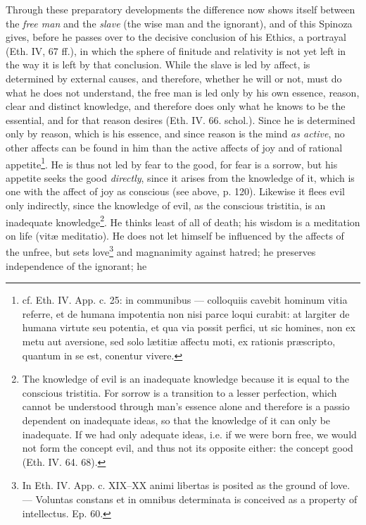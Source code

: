 \documentclass[12pt,a4paper,openany]{book}
\newcommand{\opage}[1]{\marginnote{\footnotesize\textit{[#1]}}}
\begin{document}
\opage{130}\setcounter{footnote}{0}Through these preparatory developments the difference
now shows itself between the \emph{free man} and the \emph{slave} (the wise man and
the ignorant), and of this Spinoza gives, before he passes
over to the decisive conclusion of his Ethics, a portrayal (Eth.
IV, 67 ff.), in which the sphere of finitude and relativity
is not yet left in the way it is left by that
conclusion. While the slave is led by affect, is determined
by external causes, and therefore, whether he will or not,
must do what he does not understand, the free man is led only
by his own essence, reason, clear and distinct knowledge,
and therefore does only what he knows to be the
essential, and for that reason desires (Eth. IV. 66. schol.).
Since he is determined only by reason, which is his essence,
and since reason is the mind \emph{as active}, no
other affects can be found in him than the active affects of joy and of
rational appetite\footnote{cf. Eth. IV. App. c. 25: in communibus --- colloquiis cavebit hominum
vitia referre, et de humana impotentia non nisi parce loqui
curabit: at largiter de humana virtute seu potentia, et qua via possit
perfici, ut sic homines, non ex metu aut aversione, sed solo lætitiæ
affectu moti, ex rationis præscripto, quantum in se est, conentur
vivere.}. He is thus not led by
fear to the good, for fear is a sorrow, but his appetite
seeks the good \emph{directly}, since it arises from the knowledge
of it, which is one with the affect of joy as
conscious (see above, p. 120). Likewise it flees evil only
indirectly, since the knowledge of evil, as the conscious
tristitia, is an inadequate knowledge\footnote{The knowledge of evil is an inadequate knowledge because it is
equal to the conscious tristitia. For sorrow is a transition to
a lesser perfection, which cannot be understood through man's
essence alone and therefore is a passio dependent on inadequate
ideas, so that the knowledge of it can only be inadequate. If
we had only adequate ideas, i.e. if we were born free, we would not form
the concept evil, and thus not its opposite either: the concept
good (Eth. IV. 64. 68).}.
He thinks least
\opage{131}\setcounter{footnote}{0}of all of death; his wisdom is a meditation on life
(vitæ meditatio). He does not let himself be influenced by the affects of the
unfree, but sets love\footnote{In Eth. IV. App. c. XIX--XX animi libertas is posited as the ground of
love. --- Voluntas constans et in omnibus determinata is
conceived as a property of intellectus. Ep. 60.} and magnanimity against
hatred; he preserves independence of the ignorant; he
\end{document}
